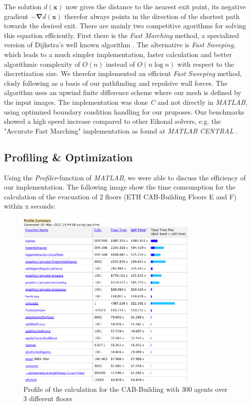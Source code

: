 \documentclass[11pt]{article}
\begin{document}
The solution $d(\mathbf{x})$ now gives the distance to the nearest exit point, its negative gradient $-\mathbf{\nabla}d(\mathbf{x})$ therefor always points in the direction of the shortest path towards the desired exit. There are mainly two competitive agorithms for solving this equation efficiently. First there is the \textit{Fast Marching} method, a specialized version of Dijkstra's well known algorithm \cite{dijkstra59a}. The alternative is \textit{Fast Sweeping}, which leads to a much simpler implementation, faster calculation and better algorithmic complexity of $O(n)$ instead of $O(n\log n)$ with respect to the discretization size. We therefor implemented an efficient \textit{Fast Sweeping} method, closly following \cite{Zhao04afast} as a basis of our pathfinding and repulsive wall forces. The algorithm uses an upwind finite difference scheme where our mesh is defined by the input images. The implementation was done \textit{C} and not directly in \textit{MATLAB}, using optimized boundary condition handling for our pruposes. Our benchmarks showed a high speed increase compared to other Eikonal solvers, e.g. the "Accurate Fast Marching" implementation as found at \textit{MATLAB CENTRAL} \cite{fastmarching}.




\subsection{Profiling \& Optimization}



Using the \textit{Profiler}-function of \textit{MATLAB}, we were able to discuss the efficiency of our implementation. The following image show the time comsumption for the calculation of the evacuation of 2 floors (ETH CAB-Building Floors E and F) within x seconds:

\begin{figure}[h]
\centering
\includegraphics[width=0.8\textwidth]{./images/profiler.png}
\caption{Profile of the calculation for the CAB-Building with 300 agents over 3 different floors} 
\label{cab profile}
\end{figure}
\end{document}
